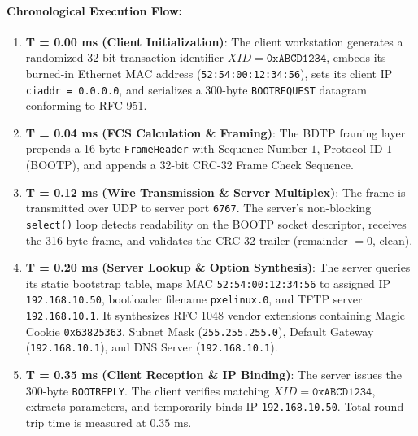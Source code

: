 \documentclass[12pt, a4paper]{article}
\begin{document}
\paragraph{Chronological Execution Flow:}
\begin{enumerate}
    \item \textbf{T = 0.00 ms (Client Initialization)}: The client workstation generates a randomized 32-bit transaction identifier $XID = \texttt{0xABCD1234}$, embeds its burned-in Ethernet MAC address (\texttt{52:54:00:12:34:56}), sets its client IP \texttt{ciaddr = 0.0.0.0}, and serializes a 300-byte \texttt{BOOTREQUEST} datagram conforming to RFC 951.
    \item \textbf{T = 0.04 ms (FCS Calculation \& Framing)}: The BDTP framing layer prepends a 16-byte \texttt{FrameHeader} with Sequence Number $1$, Protocol ID $1$ (BOOTP), and appends a 32-bit CRC-32 Frame Check Sequence.
    \item \textbf{T = 0.12 ms (Wire Transmission \& Server Multiplex)}: The frame is transmitted over UDP to server port \texttt{6767}. The server's non-blocking \texttt{select()} loop detects readability on the BOOTP socket descriptor, receives the 316-byte frame, and validates the CRC-32 trailer (remainder $= 0$, clean).
    \item \textbf{T = 0.20 ms (Server Lookup \& Option Synthesis)}: The server queries its static bootstrap table, maps MAC \texttt{52:54:00:12:34:56} to assigned IP \texttt{192.168.10.50}, bootloader filename \texttt{pxelinux.0}, and TFTP server \texttt{192.168.10.1}. It synthesizes RFC 1048 vendor extensions containing Magic Cookie \texttt{0x63825363}, Subnet Mask (\texttt{255.255.255.0}), Default Gateway (\texttt{192.168.10.1}), and DNS Server (\texttt{192.168.10.1}).
    \item \textbf{T = 0.35 ms (Client Reception \& IP Binding)}: The server issues the 300-byte \texttt{BOOTREPLY}. The client verifies matching $XID = \texttt{0xABCD1234}$, extracts parameters, and temporarily binds IP \texttt{192.168.10.50}. Total round-trip time is measured at $0.35\text{ ms}$.
\end{enumerate}
\end{document}
